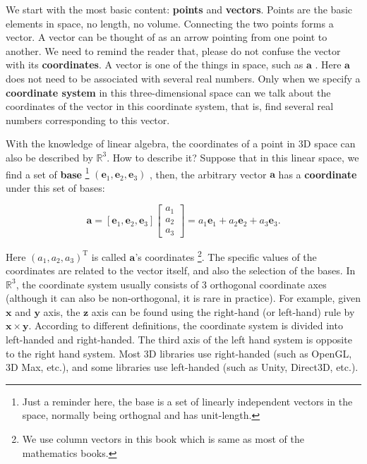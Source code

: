 We start with the most basic content: \textbf{points} and \textbf{vectors}. Points are the basic elements in space, no length, no volume. Connecting the two points forms a vector. A vector can be thought of as an arrow pointing from one point to another. We need to remind the reader that, please do not confuse the vector with its \textbf{coordinates}. A vector is one of the things in space, such as $ \mathbf{a}$ . Here $ \mathbf{a} $ does not need to be associated with several real numbers. Only when we specify a \textbf{coordinate system} in this three-dimensional space can we talk about the coordinates of the vector in this coordinate system, that is, find several real numbers corresponding to this vector.

With the knowledge of linear algebra, the coordinates of a point in 3D space can also be described by $ \mathbb{R}^3$. How to describe it? Suppose that in this linear space, we find a set of \textbf{base} \footnote{Just a reminder here, the base is a set of linearly independent vectors in the space, normally being orthognal and has unit-length.} $ (\mathbf{e}_1,\mathbf{e}_2,\mathbf{e}_3) $ , then, the arbitrary vector $ \mathbf{a} $ has a \textbf{coordinate} under this set of bases:

\begin{equation}
\mathbf{a} = \left[ {{\mathbf{e}_1},{\mathbf{e}_2},{\mathbf{e}_3}} \right]\left[ \begin{array}{l}
{a_1}\\
{a_2}\\
{a_3}
\end{array} \right] = {a_1}{\mathbf{e}_1} + {a_2}{\mathbf{e}_2} + {a_3}{\mathbf{e}_3}.
\end{equation}

Here $ (a_ 1 , a_ 2 , a_ 3 )^ \mathrm {T} $ is called $\mathbf {a}$'s coordinates \footnote {We use column vectors in this book which is same as most of the  mathematics books.}. The specific values of the coordinates are related to the vector itself, and also the selection of the bases. In $\mathbb{R}^3$, the coordinate system usually consists of 3 orthogonal coordinate axes (although it can also be non-orthogonal, it is rare in practice). For example, given $ \mathbf {x} $ and $ \mathbf {y} $ axis, the $ \mathbf {z} $ axis can be found using the right-hand (or left-hand) rule by $ \mathbf {x} \times  \mathbf {y} $. According to different definitions, the coordinate system is divided into left-handed and right-handed. The third axis of the left hand system is opposite to the right hand system. Most 3D libraries use right-handed (such as OpenGL, 3D Max, etc.), and some libraries use left-handed (such as Unity, Direct3D, etc.).

